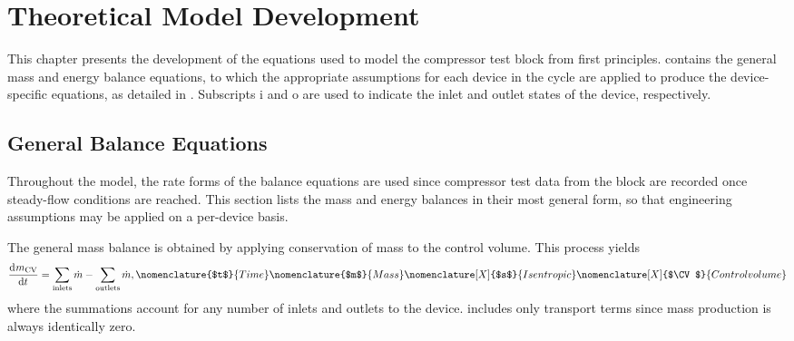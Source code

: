 \chapter{Theoretical Model Development} \label{cha:modeldev}
This chapter presents the development of the equations used to model 
the compressor test block from first principles. 
 contains the general mass and energy balance equations, 
to which the appropriate assumptions for each device in the cycle are applied 
to produce the device-specific equations, as detailed in . 
Subscripts $\text{i}$ and $\text{o}$ are used to indicate 
the inlet and outlet states of the device, respectively. 

\section{General Balance Equations} \label{sec:GenBal}
Throughout the model, the rate forms of the balance equations are used 
since compressor test data from the block are recorded once steady-flow conditions are reached. 
This section lists the mass and energy balances in their most general form, 
so that engineering assumptions may be applied on a per-device basis.

The general mass balance is obtained by 
applying conservation of mass to the control volume. 
This process yields
\begin{equation}
	\dod{m_\CV}{t} = \sum_{\text{inlets}}{\dot{m}} - \sum_{\text{outlets}}{\dot{m}},
  \label{eqn:GenMass}
	\nomenclature{$t$}{Time\nomunit{\minute}} \nomenclature{$m$}{Mass\nomunit{\kilogram}} 
	\nomenclature[X]{$s$}{Isentropic} \nomenclature[X]{$\CV$}{Control volume}
\end{equation}
where the summations account for any number of inlets and outlets to the device.
 includes only transport terms since mass production is always identically zero.

